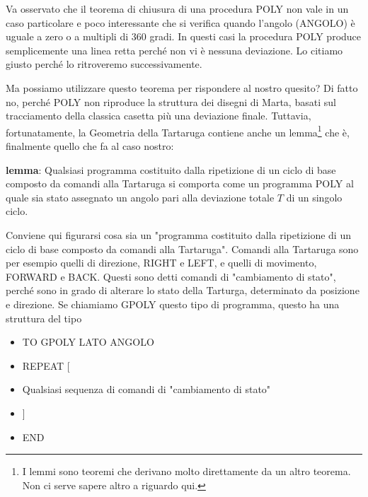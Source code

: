 Va osservato che il teorema di chiusura di una procedura POLY non vale in un caso particolare e poco interessante che si verifica quando l'angolo (ANGOLO) è uguale a zero o a multipli di 360 gradi. In questi casi la procedura POLY produce semplicemente una linea retta perché non vi è nessuna deviazione. Lo citiamo giusto perché lo ritroveremo successivamente. 

Ma possiamo utilizzare questo teorema per rispondere al nostro quesito? Di fatto no, perché POLY non riproduce la struttura dei disegni di Marta, basati sul tracciamento della classica casetta più una deviazione finale. Tuttavia, fortunatamente, la Geometria della Tartaruga contiene anche un lemma\footnote{I lemmi sono teoremi che derivano molto direttamente da un altro teorema. Non ci serve sapere altro a riguardo qui.} che è, finalmente quello che fa al caso nostro:  

\textbf{lemma}: Qualsiasi programma costituito dalla ripetizione di un ciclo di base composto da comandi alla Tartaruga si comporta come un programma POLY al quale sia stato assegnato un angolo pari alla deviazione totale $T$ di un singolo ciclo.

Conviene qui figurarsi cosa sia un "programma costituito dalla ripetizione di un ciclo di base composto da comandi alla Tartaruga". Comandi alla Tartaruga sono per esempio quelli di direzione, RIGHT e LEFT, e quelli di movimento, FORWARD e BACK. Questi sono detti comandi di "cambiamento di stato", perché sono in grado di alterare lo stato della Tarturga, determinato da posizione e direzione. Se chiamiamo GPOLY questo tipo di programma, questo ha una struttura del tipo 

\vskip 1cm

\begin{minipage}{1.0\textwidth}
\begin{itemize}[itemsep=-3pt,parsep=2pt]
\item[] TO GPOLY LATO ANGOLO 
\item[] \hspace{8pt}    REPEAT [
\item[] \hspace{0.75cm} Qualsiasi sequenza di comandi di "cambiamento di stato"
\item[] \hspace{8pt}   ]
\item[] END
\end{itemize}          	          
\end{minipage}

\vskip 1cm

